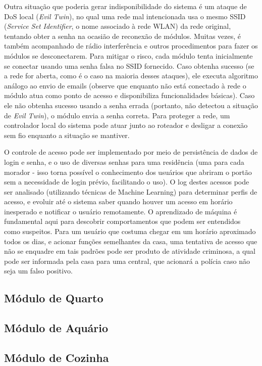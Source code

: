Outra situação que poderia gerar indisponibilidade do sistema é um ataque de DoS local (\textit{Evil Twin}), no qual uma rede mal intencionada usa o mesmo SSID (\textit{Service Set Identifier}, o nome associado à rede WLAN) da rede original, tentando obter a senha na ocasião de reconexão de módulos. Muitas vezes, é também acompanhado de rádio interferência e outros procedimentos para fazer os módulos se desconectarem. Para mitigar o risco, cada módulo tenta inicialmente se conectar usando uma senha falsa no SSID fornecido. Caso obtenha sucesso (se a rede for aberta, como é o caso na maioria desses ataques), ele executa algoritmo análogo ao envio de emails (observe que enquanto não está conectado à rede o módulo atua como ponto de acesso e disponibiliza funcionalidades básicas). Caso ele não obtenha sucesso usando a senha errada (portanto, não detectou a situação de \textit{Evil Twin}), o módulo envia a senha correta. Para proteger a rede, um controlador local do sistema pode atuar junto ao roteador e desligar a conexão sem fio enquanto a situação se mantiver.

O controle de acesso pode ser implementado por meio de persistência de dados de login e senha, e o uso de diversas senhas para uma residência (uma para cada morador - isso torna possível o conhecimento dos usuários que abriram o portão sem a necessidade de login prévio, facilitando o uso). O log destes acessos pode ser analisado (utilizando técnicas de Machine Learning) para determinar perfis de acesso, e evoluir até o sistema saber quando houver um acesso em horário inesperado e notificar o usuário remotamente. O aprendizado de máquina é fundamental aqui para descobrir comportamentos que podem ser entendidos como suspeitos. Para um usuário que costuma chegar em um horário aproximado todos os dias, e acionar funções semelhantes da casa, uma tentativa de acesso que não se enquadre em tais padrões pode ser produto de atividade criminosa, a qual pode ser informada pela casa para uma central, que acionará a polícia caso não seja um falso positivo.

\subsection{Módulo de Quarto}

\subsection{Módulo de Aquário}

\subsection{Módulo de Cozinha}
